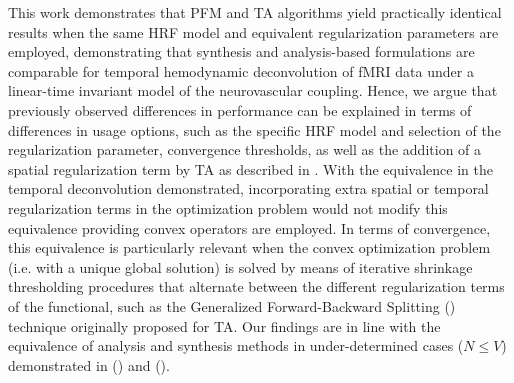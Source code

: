 
This work demonstrates that PFM and TA algorithms yield practically identical results when the same HRF model and equivalent regularization parameters are employed, demonstrating that synthesis and analysis-based formulations are comparable for temporal hemodynamic deconvolution of fMRI data under a linear-time invariant model of the neurovascular coupling. Hence, we argue that previously observed differences in performance can be explained in terms of differences in usage options, such as the specific HRF model and selection of the regularization parameter, convergence thresholds, as well as the addition of a spatial regularization term by TA as described in \citealt{Karahanoglu2013TotalactivationfMRI}. With the equivalence in the temporal deconvolution demonstrated, incorporating extra spatial or temporal regularization terms in the optimization problem would not modify this equivalence providing convex operators are employed. In terms of convergence, this equivalence is particularly relevant when the convex optimization problem (i.e. with a unique global solution) is solved by means of iterative shrinkage thresholding procedures that alternate between the different regularization terms of the functional, such as the Generalized Forward-Backward Splitting (\citealt{Raguet2013GeneralizedForwardBackward}) technique originally proposed for TA. Our findings are in line with the equivalence of analysis and synthesis methods in under-determined cases (\(N \leq V\)) demonstrated in (\citealt{Elad2007Analysisversussynthesis}) and (\citealt{ortelli2019synthesis}).


